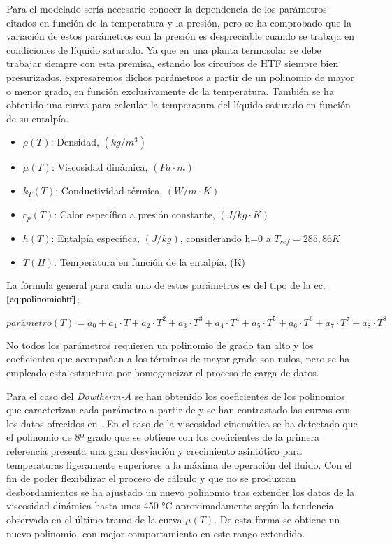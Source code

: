 Para el modelado sería necesario conocer la dependencia de los parámetros citados en función de la temperatura y la presión, pero se ha comprobado que la variación de estos parámetros con la presión es despreciable cuando se trabaja en condiciones de líquido saturado. Ya que en una planta termosolar se debe trabajar siempre con esta premisa, estando los circuitos de HTF siempre bien presurizados, expresaremos dichos parámetros  a partir de un polinomio de mayor o menor grado, en función exclusivamente de la temperatura. También se ha obtenido una curva para calcular la temperatura del líquido saturado en función de su entalpía.

\begin{itemize}
\item
  $\rho(T)$: Densidad, $(kg/m^3)$
\item
  $\mu(T)$: Viscosidad dinámica, $(Pa \cdot m)$
\item
  $k_T(T)$: Conductividad térmica, $(W/m \cdot K)$
\item
  $c_p(T)$: Calor específico a presión constante, $(J/kg\cdot K)$
\item
$h(T)$: Entalpía específica, $(J/kg)$, considerando h=0 a $T_{ref}= 285,86 K$
\item
$T(H)$: Temperatura en función de la entalpía, (K)
\end{itemize}

La fórmula general para cada uno de estos parámetros es del tipo de la ec.\(\eqref{eq:polinomiohtf}\):

\begin{equation}
   parámetro(T) = a_0 + a_1 \cdot T + a_2 \cdot T^2 + a_3 \cdot T^3 + a_4 \cdot T^4 + a_5 \cdot T^5 + a_6 \cdot T^6 +  a_7 \cdot T^7 + a_8 \cdot T^8   
    \label{eq:polinomiohtf}
\end{equation}

No todos los parámetros requieren un polinomio de grado tan alto y los coeficientes que acompañan a los términos de mayor grado son nulos, pero se ha empleado esta estructura por homogeneizar el proceso de carga de datos.

Para el caso del \emph{Dowtherm-A} se han obtenido los coeficientes de los polinomios que caracterizan cada parámetro a partir de \cite{richardl.mooreImplementationDOWTHERMProperties2010} y se han contrastado las curvas con los datos ofrecidos en \cite{machadoProductTechnicalData}. En el caso de la viscosidad cinemática se ha detectado que el polinomio de 8º grado que se obtiene con los coeficientes de la primera referencia presenta una gran desviación y crecimiento asintótico para temperaturas ligeramente superiores a la máxima de operación del fluido. Con el fin de poder flexibilizar el proceso de cálculo y que no se produzcan desbordamientos se ha ajustado un nuevo polinomio tras extender los datos de la viscosidad dinámica hasta unos 450 °C aproximadamente según la tendencia observada en el último tramo de la curva \(\mu(T)\). De esta forma se obtiene un nuevo polinomio, con mejor comportamiento en este rango extendido.

